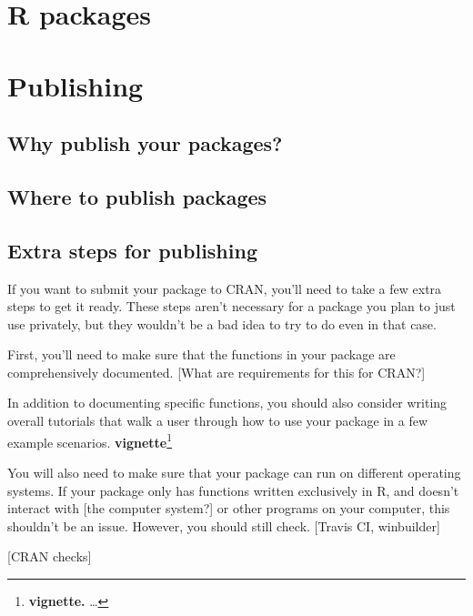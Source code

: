 \documentclass[]{tufte-book}
\begin{document}
\hypertarget{r-packages}{%
\section{R packages}\label{r-packages}}

\hypertarget{publishing}{%
\section{Publishing}\label{publishing}}

\hypertarget{why-publish-your-packages}{%
\subsection{Why publish your packages?}\label{why-publish-your-packages}}

\hypertarget{where-to-publish-packages}{%
\subsection{Where to publish packages}\label{where-to-publish-packages}}

\hypertarget{extra-steps-for-publishing}{%
\subsection{Extra steps for publishing}\label{extra-steps-for-publishing}}

If you want to submit your package to CRAN, you'll need to take a few extra steps
to get it ready. These steps aren't necessary for a package you plan to just
use privately, but they wouldn't be a bad idea to try to do even in that case.

First, you'll need to make sure that the functions in your package are
comprehensively documented. {[}What are requirements for this for CRAN?{]}

In addition to documenting specific functions, you should also consider
writing overall tutorials that walk a user through how to use your
package in a few example scenarios. \textbf{vignette}\footnote{\textbf{vignette.} \ldots{}}

You will also need to make sure that your package can run on different
operating systems. If your package only has functions written exclusively
in R, and doesn't interact with {[}the computer system?{]} or other programs
on your computer, this shouldn't be an issue. However, you should still
check. {[}Travis CI, winbuilder{]}

{[}CRAN checks{]}
\end{document}
